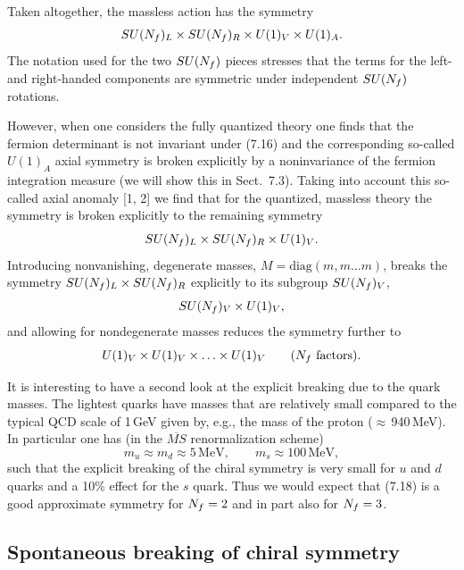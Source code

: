 Taken altogether, the massless action has the symmetry
\begin{equation}
  SU(N_f)_L \times SU(N_f)_R \times U(1)_V \times U(1)_A .
\end{equation}
The notation used for the two $SU(N_f)$ pieces stresses that the terms for the
left- and right-handed components are symmetric under independent $SU(N_f)$
rotations.

However, when one considers the fully quantized theory one finds that the
fermion determinant is not invariant under (7.16) and the corresponding
so-called $U(1)_A$ axial symmetry is broken explicitly by a noninvariance of
the fermion integration measure (we will show this in Sect.~7.3). Taking into
account this so-called axial anomaly [1, 2] we find that for the quantized,
massless theory the symmetry is broken explicitly to the remaining symmetry
\begin{equation}
  SU(N_f)_L \times SU(N_f)_R \times U(1)_V .
\end{equation}
Introducing nonvanishing, degenerate masses, $M = \mathrm{diag}(m, m \ldots
m)$, breaks the symmetry $SU(N_f)_L \times SU(N_f)_R$ explicitly to its
subgroup $SU(N_f)_V$,
\begin{equation}
  SU(N_f)_V \times U(1)_V,
\end{equation}
and allowing for nondegenerate masses reduces the symmetry further to
\begin{equation}
  U(1)_V \times U(1)_V \times \ldots \times U(1)_V
  \qquad (N_f \text{ factors}) .
\end{equation}

It is interesting to have a second look at the explicit breaking due to the
quark masses. The lightest quarks have masses that are relatively small
compared to the typical QCD scale of 1\,GeV given by, e.g., the mass of the
proton ($\approx$\,940\,MeV). In particular one has (in the $\overline{MS}$
renormalization scheme)
\begin{equation}
  m_u \approx m_d \approx 5\,\mathrm{MeV}, \qquad m_s \approx 100\,\mathrm{MeV},
\end{equation}
such that the explicit breaking of the chiral symmetry is very small for $u$
and $d$ quarks and a 10\% effect for the $s$ quark. Thus we would expect that
(7.18) is a good approximate symmetry for $N_f = 2$ and in part also for
$N_f = 3$.

\subsection{Spontaneous breaking of chiral symmetry}

